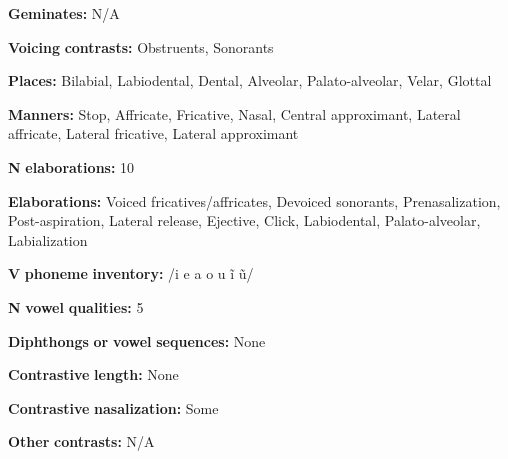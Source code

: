 \begin{styleBody}
\textbf{Geminates:} N/A
\end{styleBody}

\begin{styleBody}
\textbf{Voicing} \textbf{contrasts:} Obstruents, Sonorants
\end{styleBody}

\begin{styleBody}
\textbf{Places:} Bilabial, Labiodental, Dental, Alveolar, Palato-alveolar, Velar, Glottal
\end{styleBody}

\begin{styleBody}
\textbf{Manners:} Stop, Affricate, Fricative, Nasal, Central approximant, Lateral affricate, Lateral fricative, Lateral approximant
\end{styleBody}

\begin{styleBody}
\textbf{N} \textbf{elaborations:} 10
\end{styleBody}

\begin{styleBody}
\textbf{Elaborations:} Voiced fricatives/affricates, Devoiced sonorants, Prenasalization, Post-aspiration, Lateral release, Ejective, Click, Labiodental, Palato-alveolar, Labialization
\end{styleBody}

\begin{styleBody}
\textbf{V} \textbf{phoneme} \textbf{inventory:} /i e a o u ĩ ũ/
\end{styleBody}

\begin{styleBody}
\textbf{N} \textbf{vowel} \textbf{qualities:} 5
\end{styleBody}

\begin{styleBody}
\textbf{Diphthongs} \textbf{or} \textbf{vowel} \textbf{sequences:} None
\end{styleBody}

\begin{styleBody}
\textbf{Contrastive} \textbf{length:} None
\end{styleBody}

\begin{styleBody}
\textbf{Contrastive} \textbf{nasalization:} Some
\end{styleBody}

\begin{styleBody}
\textbf{Other} \textbf{contrasts:} N/A
\end{styleBody}


